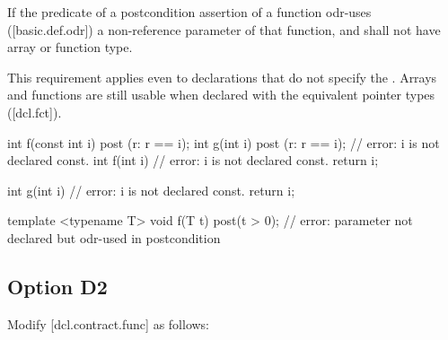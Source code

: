 \begin{adjustwidth}{0.5cm}{0.5cm}
If the predicate of a postcondition assertion of a function odr-uses ([basic.def.odr]) a
non-reference parameter of that function, and
shall not have array or function type.
\begin{note}
This requirement applies even to declarations that do not specify the . Arrays and functions are still usable when
declared with the equivalent pointer types ([dcl.fct]). 
\end{note}
\begin{example}
\begin{codeblock}
int f(const int i)
post (r: r == i);
int g(int i)
post (r: r == i); // error: i is not declared const.
int f(int i) // error: i is not declared const.
{
  return i;
}

int g(int i) // error: i is not declared const.
{
  return i;
}
\end{codeblock}
\begin{addedblock}
\begin{codeblock}
template <typename T>
void f(T t) post(t > 0);  // error: parameter not declared  but odr-used in postcondition 
\end{codeblock}
\end{addedblock}
\end{example}
\end{adjustwidth}

\subsection{Option D2}

Modify [dcl.contract.func] as follows:

